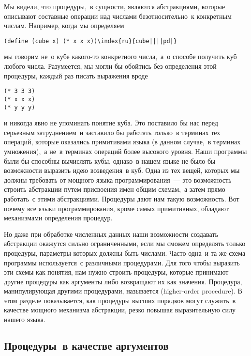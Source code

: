 Мы видели, что процедуры,~в сущности, являются абстракциями, которые
описывают составные операции над числами безотносительно~к конкретным
числам. Например, когда мы определяем

\begin{Verbatim}[fontsize=\small]
(define (cube x) (* x x x))\index{ru}{cube||||pd|}
\end{Verbatim}
мы говорим не~о кубе какого-то конкретного числа,~а~о способе получить 
куб любого числа. Разумеется, мы могли бы обойтись без определения
этой процедуры, каждый раз писать выражения вроде

\begin{Verbatim}[fontsize=\small]
(* 3 3 3)
(* x x x)
(* y y y)
\end{Verbatim}
и никогда явно не упоминать понятие куба.  Это поставило бы нас перед
серьезным затруднением~и заставило бы работать только~в терминах тех
операций, которые оказались примитивами языка (в данном случае,~в терминах
умножения),~а не~в терминах операций более высокого уровня.  Наши
программы были бы способны вычислять кубы, однако~в нашем языке не
было бы возможности выразить идею возведения~в куб.  Одна из тех
вещей, которых мы должны требовать от мощного языка программирования~--- это возможность строить абстракции путем присвоения имен общим
схемам,~а затем прямо работать~с этими абстракциями.  Процедуры дают
нам такую возможность.  Вот почему все языки программирования, кроме
самых примитивных, обладают механизмами определения процедур.

Но даже при обработке численных данных наши возможности
создавать абстракции окажутся сильно ограниченными, если мы сможем
определять только процедуры, параметры которых должны быть
числами. Часто одна~и та же схема программы используется~с различными
процедурами.  Для того чтобы выразить эти схемы как понятия, нам
нужно строить процедуры, которые принимают другие процедуры как
аргументы либо возвращают их как значения.  Процедура, манипулирующая
другими процедурами, называется  (higher-order procedure). В этом разделе
показывается, как процедуры высших порядков могут служить~в качестве
мощного механизма абстракции, резко повышая выразительную силу нашего
языка.

\subsection{Процедуры~в качестве аргументов}
\label{PROCEDURES-AS-ARGUMENTS}


